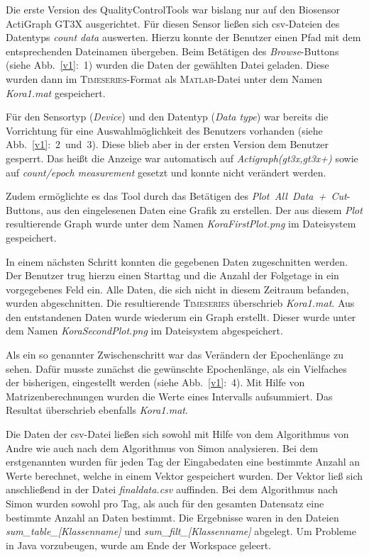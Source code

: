 \documentclass[onecolumn,german]{article}
\begin{document}
Die erste Version des QualityControlTools \cite{idp} war bislang nur auf den Biosensor ActiGraph GT3X ausgerichtet. Für diesen Sensor ließen sich csv-Dateien des Datentyps \textit{count data} auswerten. Hierzu konnte der Benutzer einen Pfad mit dem entsprechenden Dateinamen übergeben. Beim Betätigen des \textit{Browse}-Buttons (siehe Abb.~\ref{v1}:~1) wurden die Daten der gewählten Datei geladen. Diese wurden dann im \textsc{Timeseries}-Format als \textsc{Matlab}-Datei unter dem Namen \textit{Kora1.mat} gespeichert.\newline

Für den Sensortyp (\textit{Device}) und den Datentyp (\textit{Data type}) war bereits die Vorrichtung für eine Auswahlmöglichkeit des Benutzers vorhanden (siehe Abb.~\ref{v1}:~2~und~3). Diese blieb aber in der ersten Version dem Benutzer gesperrt. Das heißt die Anzeige war automatisch auf \textit{Actigraph(gt3x,gt3x+)} sowie auf \textit{count/epoch measurement} gesetzt und konnte nicht verändert werden.\newline

Zudem ermöglichte es das Tool durch das Betätigen des \mbox{\textit{Plot All Data + Cut}-Buttons}, aus den eingelesenen Daten eine Grafik zu erstellen. Der aus diesem \textit{Plot} resultierende Graph wurde unter dem Namen \textit{KoraFirstPlot.png} im Dateisystem gespeichert.\newline

In einem nächsten Schritt konnten die gegebenen Daten zugeschnitten werden. Der Benutzer trug hierzu einen Starttag und die Anzahl der Folgetage in ein vorgegebenes Feld ein. Alle Daten, die sich nicht in diesem Zeitraum befanden, wurden abgeschnitten. Die resultierende \textsc{Timeseries} überschrieb \textit{Kora1.mat}. Aus den entstandenen Daten wurde wiederum ein Graph erstellt. Dieser wurde unter dem Namen \textit{KoraSecondPlot.png} im Dateisystem abgespeichert.\newline

Als ein so genannter Zwischenschritt war das Verändern der Epochenlänge zu sehen. Dafür musste zunächst die gewünschte Epochenlänge, als ein Vielfaches der bisherigen, eingestellt werden (siehe Abb.~\ref{v1}:~4). Mit Hilfe von Matrizenberechnungen wurden die Werte eines Intervalls aufsummiert. Das Resultat überschrieb ebenfalls \textit{Kora1.mat}.\newline

Die Daten der csv-Datei ließen sich sowohl mit Hilfe von dem Algorithmus von Andre wie auch nach dem Algorithmus von Simon analysieren.
Bei dem erstgenannten wurden für jeden Tag der Eingabedaten eine bestimmte Anzahl an Werte berechnet, welche in einem Vektor gespeichert wurden. Der Vektor ließ sich anschließend in der Datei \textit{finaldata.csv} auffinden. Bei dem Algorithmus nach Simon wurden sowohl pro Tag, als auch für den gesamten Datensatz eine bestimmte Anzahl an Daten bestimmt. Die Ergebnisse waren in den Dateien \textit{sum\_table\_[Klassenname]} und \textit{sum\_filt\_[Klassenname]} abgelegt. Um Probleme in Java vorzubeugen, wurde am Ende der Workspace geleert.\newline
\end{document}
